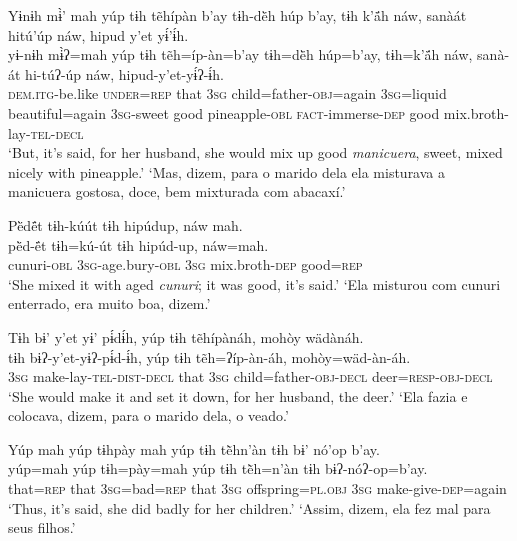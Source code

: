 \documentclass[output=paper,
modfonts,nonflat
]{langsci/langscibook}
\begin{document}
\ea  Yɨnɨh mɨ̀’ mah yúp tɨh tẽhípàn b’ay tɨh-dë̀h húp b’ay, tɨh k’ä́h náw, sanàát hitú’úp náw, hipud y’et yɨ́’ɨ́h.\\ 
\gll yɨ-nɨh mɨ̀ʔ=mah yúp tɨh tẽh=íp-àn=b’ay tɨh=dë̀h húp=b’ay, tɨh=k’ä́h náw, sanà-át hi-túʔ-úp náw, hipud-y’et-yɨ́ʔ-ɨ́h.\\
     \textsc{dem.itg-}be.like \textsc{under=rep} that \textsc{3sg} child=father\textsc{-obj}=again \textsc{3sg=}liquid beautiful=again \textsc{3sg-}sweet good pineapple\textsc{-obl} \textsc{fact-}immerse\textsc{-dep} good mix.broth-lay\textsc{-tel-decl}\\
\glt ‘But, it’s said, for her husband, she would mix up good \textit{manicuera}, sweet, mixed nicely with pineapple.'
\glt ‘Mas, dizem, para o marido dela ela misturava a manicuera gostosa, doce, bem mixturada com abacaxí.'
\z 

\ea  Pë̀dë́t tɨh-kúút tɨh hipúdup, náw mah.\\ 
\gll pë̀d-ë́t tɨh=kú-út tɨh hipúd-up, náw=mah.\\
     cunuri\textsc{-obl} \textsc{3sg-}age.bury\textsc{-obl} \textsc{3sg} mix.broth\textsc{-dep} good\textsc{=rep}\\
\glt ‘She mixed it with aged \textit{cunuri};{\footnotemark} it was good, it's said.'
\glt ‘Ela misturou com cunuri enterrado, era muito boa, dizem.'
\z 

\newpage
\ea  Tɨh bɨ’ y’et yɨ’ pɨ́dɨ́h, yúp tɨh tẽhípànáh, mohòy wädànáh.{\footnotemark}\\ 
\gll tɨh bɨʔ-y’et-yɨʔ-pɨ́d-ɨ́h, yúp tɨh tẽh=ʔíp-àn-áh, mohòy=wäd-àn-áh.\\
     \textsc{3sg} make-lay\textsc{-tel-dist-decl} that \textsc{3sg} child=father\textsc{-obj-decl} deer\textsc{=resp-obj-decl}\\
\glt ‘She would make it and set it down, for her husband, the deer.'
\glt ‘Ela fazia e colocava, dizem, para o marido dela, o veado.'
\z 

\ea  Yúp mah yúp tɨhpày mah yúp tɨh tẽ̀hn’àn tɨh bɨ’ nó’op b’ay.\\ 
\gll yúp=mah yúp tɨh=pày=mah yúp tɨh tẽ̀h=n’àn tɨh bɨʔ-nóʔ-op=b’ay.\\
     that\textsc{=rep} that \textsc{3sg=}bad\textsc{=rep} that \textsc{3sg} offspring\textsc{=pl.obj} \textsc{3sg} make-give\textsc{-dep}=again\\
\glt ‘Thus, it’s said, she did badly for her children.'
\glt ‘Assim, dizem, ela fez mal para seus filhos.'
\z 
\end{document}
